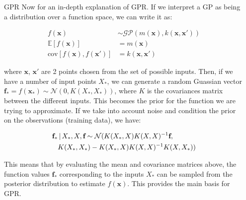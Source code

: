 \documentclass[final]{beamer}
\newcommand{\vbar}{\hspace{-0.4mm} \mathrel{|} \hspace{-0.4mm}}
\newlength{\onecolwid}
\newlength{\twocolwid}
\begin{document}
\begin{frame}[t]
\begin{columns}[t]
\begin{column}{\twocolwid}
\begin{columns}[t,totalwidth=\twocolwid]
\begin{column}{\onecolwid}
\begin{block}{GPR}
    Now for an in-depth explanation of GPR. If we interpret a GP as being a distribution over
    a function space, we can write it as:\vspace{-1.25cm}

    \begin{align*}
        f(\textbf{x})                             &\sim \mathcal{GP}(m(\textbf{x}), k(\textbf{x}, \textbf{x}')) \\
        \mathbb{E}[f(\textbf{x})]                 &= m(\textbf{x})                                           \\
        \text{cov}[f(\textbf{x}), f(\textbf{x}')] &= k(\textbf{x}, \textbf{x}')
    \end{align*}

    where $\textbf{x}$, $\textbf{x}'$ are 2 points chosen from the set of possible inputs. Then,
    if we have a number of input points $X_{*}$, we can generate a random Guassian vector
    $\textbf{f}_{*} = f(\textbf{x}_{*}) \sim \mathcal{N}(0, K(X_{*}, X_{*}))$, where $K$ is the
    covariances matrix between the different inputs. This becomes the prior for the function
    we are trying to approximate. If we take into account noise and condition the prior on the
    observations (training data), we have:\vspace{-1.25cm}

    \begin{align*}
        \textbf{f}_{*} & \vbar X_{*}, X, \textbf{f} \sim \mathcal{N}(K(X_{*}, X)K(X, X)^{-1} \textbf{f}, \\
                       & K(X_{*}, X_{*}) - K(X_{*}, X)K(X, X)^{-1} K(X, X_{*}))
    \end{align*}

    This means that by evaluating the mean and covariance matrices above, the function values
    $\textbf{f}_{*}$ corresponding to the inputs $X_{*}$ can be sampled from the posterior
    distribution to estimate $f(\textbf{x})$. This provides the main basis for GPR.

\end{block}


\end{column} %

\begin{column}{\onecolwid}\vspace{-.6in} %


\end{column}
\end{columns}
\end{column}
\end{columns}
\end{frame}
\end{document}
